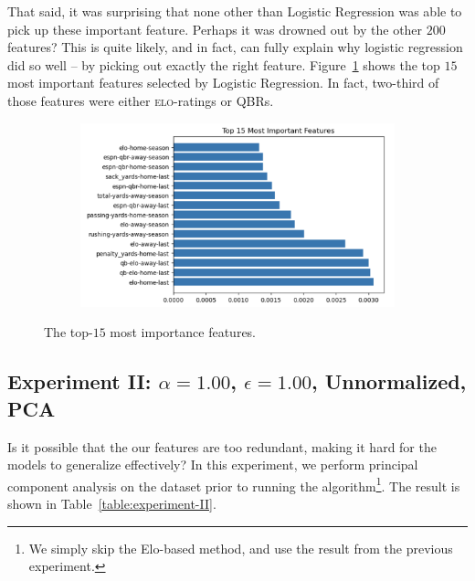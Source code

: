 \documentclass[10pt]{article}
\begin{document}
That said, it was surprising that
none other than Logistic Regression was able to pick up these important feature. Perhaps it was
drowned out by the other $200$ features? This is quite likely, and in fact, can fully
explain why logistic regression did so well -- by picking out exactly the right feature.
Figure~\ref{fig:feature-importance} shows the top $15$ most important features selected by
Logistic Regression. In fact, two-third of those features were either \textsc{elo}-ratings or QBRs.

\begin{figure}[htbp]
\centering
\begin{subfigure}{0.81\columnwidth}
\includegraphics[width=\columnwidth]{feature-importance.png}
\end{subfigure}
\caption{The top-$15$ most importance features.} 
\label{fig:feature-importance}
\end{figure}


\subsection{Experiment II: $\alpha=1.00$, $\epsilon = 1.00$, Unnormalized, PCA}

Is it possible that the our features are too redundant, making it hard for the
models to generalize effectively? In this experiment, we perform principal component analysis
on the dataset prior to running the algorithm\footnote{We simply skip the Elo-based method,
and use the result from the previous experiment.}. The result is
shown in Table~\ref{table:experiment-II}.
\end{document}
